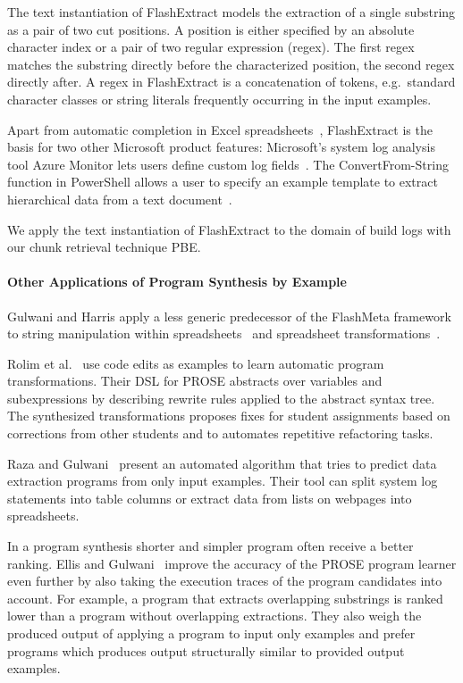 \documentclass[\myrootdir/main.tex]{subfiles}
\begin{document}
The text instantiation of FlashExtract models the extraction of a single substring as a pair of two cut positions.
A position is either specified by an absolute character index or a pair of two regular expression (regex).
The first regex matches the substring directly before the characterized position, the second regex directly after.
A regex in FlashExtract is a concatenation of tokens, e.g.\ standard character classes or string literals frequently occurring in the input examples.

Apart from automatic completion in Excel spreadsheets~\cite{excel2019flashfill}, FlashExtract is the basis for two other Microsoft product features:
Microsoft's system log analysis tool Azure Monitor lets users define custom log fields~\cite{azure2019custom}.
The ConvertFrom-String function in PowerShell allows a user to specify an example template to extract hierarchical data from a text document~\cite{powershell2019convert}.

We apply the text instantiation of FlashExtract to the domain of build logs with our chunk retrieval technique PBE\@.

\paragraph{Other Applications of Program Synthesis by Example}
Gulwani and Harris apply a less generic predecessor of the FlashMeta framework to string manipulation within spreadsheets~\cite{gulwani2011automating} and spreadsheet transformations~\cite{harris2011spreadsheet}.

Rolim et al.~\cite{rolim2017learning} use code edits as examples to learn automatic program transformations.
Their DSL for PROSE abstracts over variables and subexpressions by describing rewrite rules applied to the abstract syntax tree.
The synthesized transformations proposes fixes for student assignments based on corrections from other students and to automates repetitive refactoring tasks.

Raza and Gulwani~\cite{raza2017automated} present an automated algorithm that tries to predict data extraction programs from only input examples.
Their tool can split system log statements into table columns or extract data from lists on webpages into spreadsheets.

In a program synthesis shorter and simpler program often receive a better ranking.
Ellis and Gulwani~\cite{ellis2017learning} improve the accuracy of the PROSE program learner even further by also taking the execution traces of the program candidates into account.
For example, a program that extracts overlapping substrings is ranked lower than a program without overlapping extractions.
They also weigh the produced output of applying a program to input only examples and prefer programs which produces output structurally similar to provided output examples.
\end{document}
